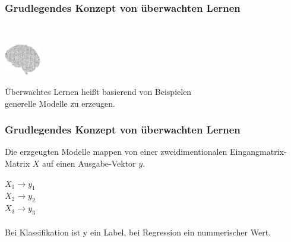 \documentclass[aspectratio=169]{beamer}
\begin{document}
\begin{frame}
  \frametitle{Grudlegendes Konzept von überwachten Lernen}
  \begin{block}{}
    \vspace{0.5cm}
    \ \ \ \
    \begin{minipage}{0.15\textwidth}
      \includegraphics[width=1.6cm]{images/publicdomainvectors_Random-Alphabet-Brain.pdf}
    \end{minipage}
    \hfill
    \begin{minipage}{0.75\textwidth}
      Überwachtes Lernen heißt basierend von Beispielen\\
      generelle Modelle zu erzeugen.\\
    \end{minipage}
    \vspace{0.3cm}
  \end{block}
\end{frame}

\begin{frame}
  \frametitle{Grudlegendes Konzept von überwachten Lernen}
  \begin{block}{}
      \begin{center}
        Die erzgeugten Modelle mappen von einer zweidimentionalen
        Eingangmatrix-Matrix $X$ auf einen Ausgabe-Vektor $y$.

      $X_{1} \rightarrow y_{1}$\\
      $X_{2} \rightarrow y_{2}$\\
      $X_{3} \rightarrow y_{3}$\\
        \ \\
     Bei Klassifikation ist y ein Label, bei Regression ein nummerischer Wert.
      \end{center}
    \end{block}
\end{frame}
\end{document}
